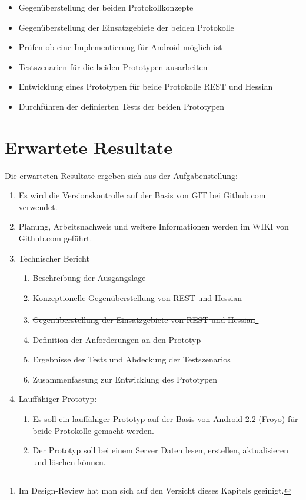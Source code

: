 \documentclass[abstracton, listof=totocnumbered,
bibliography=totocnumbered]{scrreprt}
\begin{document}
  \begin{itemize}
    \item Gegenüberstellung der beiden Protokollkonzepte
    \item Gegenüberstellung der Einsatzgebiete der beiden Protokolle
    \item Prüfen ob eine Implementierung für Android möglich ist
    \item Testszenarien für die beiden Prototypen ausarbeiten
    \item Entwicklung eines Prototypen für beide Protokolle \ac{REST} und
          Hessian
    \item Durchführen der definierten Tests der beiden Prototypen
  \end{itemize}
  
  \section{Erwartete Resultate}
  Die erwarteten Resultate ergeben sich aus der Aufgabenstellung:
  
  \begin{enumerate}
    \item Es wird die Versionskontrolle auf der Basis von GIT bei
          Github.com verwendet.
    \item Planung, Arbeitsnachweis und weitere Informationen werden im WIKI
          von Github.com geführt.
    \item Technischer Bericht
    \begin{enumerate}
      \item Beschreibung der Ausgangslage
      \item Konzeptionelle Gegenüberstellung von \ac{REST} und Hessian
      \item \sout{Gegenüberstellung der Einsatzgebiete von \ac{REST} und
      Hessian}\footnote[4]{
        Im Design-Review hat man sich auf den Verzicht dieses Kapitels
        geeinigt.}
      \item Definition der Anforderungen an den Prototyp 
      \item Ergebnisse der Tests und Abdeckung der Testszenarios
      \item Zusammenfassung zur Entwicklung des Prototypen
    \end{enumerate}
    \item Lauffähiger Prototyp:
    \begin{enumerate}
      \item Es soll ein lauffähiger Prototyp auf der Basis von
            Android 2.2 (Froyo) für beide Protokolle gemacht werden.
      \item Der Prototyp soll bei einem Server Daten lesen, erstellen,
            aktualisieren und löschen können.
    \end{enumerate}
  \end{enumerate}
  
\end{document}
